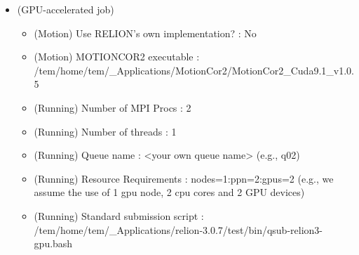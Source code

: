 \documentclass[letterpaper,10pt,english]{sphinxmanual}
\begin{document}
\begin{itemize}
\item {} 
 (GPU-accelerated job)
\begin{itemize}
\item {} 
(Motion) Use RELION’s own implementation? : No

\item {} 
(Motion) MOTIONCOR2 executable : /tem/home/tem/\_Applications/MotionCor2/MotionCor2\_Cuda9.1\_v1.0.5

\item {} 
(Running) Number of MPI Procs : 2

\item {} 
(Running) Number of threads : 1

\item {} 
(Running) Queue name : \textless{}your own queue name\textgreater{} (e.g., q02)

\item {} 
(Running) Resource Requirements : nodes=1:ppn=2:gpus=2  (e.g., we assume the use of 1 gpu node, 2 cpu cores  and 2 GPU devices)

\item {} 
(Running) Standard submission script : /tem/home/tem/\_Applications/relion-3.0.7/test/bin/qsub-relion3-gpu.bash

\end{itemize}

\end{itemize}


\end{document}
